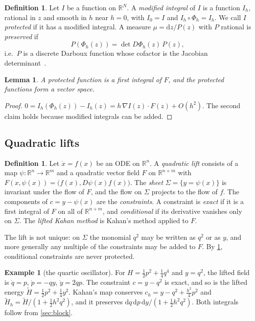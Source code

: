 \documentclass[11pt,a4paper]{article}
\newtheorem{lemma}[theorem]{Lemma}
\theoremstyle{definition}
\newtheorem{definition}[theorem]{Definition}
\newtheorem{example}[theorem]{Example}
\theoremstyle{remark}
\newcommand{\R}{\mathbb{R}}
\newcommand{\dd}{\mathrm{d}}
\begin{document}
\begin{definition}
Let $I$ be a function on $\R^N$. A \emph{modified integral} of $I$ is a function $I_h$, rational in $z$ and
smooth in $h$ near $h=0$, with $I_0=I$ and $I_h\circ\Phi_h=I_h$. We call $I$ \emph{protected} if it has a
modified integral. A measure $\mu=\dd z/P(z)$ with $P$ rational is \emph{preserved} if
\begin{equation}\label{eq:measure}
P(\Phi_h(z))=\det D\Phi_h(z)\,P(z),
\end{equation}
i.e.\ $P$ is a discrete Darboux function whose cofactor is the Jacobian determinant~\cite{CEMOQTvdK19}.
\end{definition}

\begin{lemma}\label{lem:protected}
A protected function is a first integral of $F$, and the protected functions form a vector space.
\end{lemma}

\begin{proof}
$0=I_h(\Phi_h(z))-I_h(z)=h\,\nabla I(z)\cdot F(z)+O(h^2)$. The second claim holds because modified integrals
can be added.
\end{proof}

\subsection{Quadratic lifts}

\begin{definition}\label{def:lift}
Let $\dot x=f(x)$ be an ODE on $\R^n$. A \emph{quadratic lift} consists of a map $\psi\colon\R^n\to\R^m$ and a
quadratic vector field $F$ on $\R^{n+m}$ with $F(x,\psi(x))=\big(f(x),D\psi(x)f(x)\big)$. The \emph{sheet}
$\Sigma=\{y=\psi(x)\}$ is invariant under the flow of $F$, and the flow on $\Sigma$ projects to the flow of $f$.
The components of $c=y-\psi(x)$ are the \emph{constraints}. A constraint is \emph{exact} if it is a first
integral of $F$ on all of $\R^{n+m}$, and \emph{conditional} if its derivative vanishes only on $\Sigma$. The
\emph{lifted Kahan method} is Kahan's method applied to $F$.
\end{definition}

The lift is not unique: on $\Sigma$ the monomial $q^2$ may be written as $q^2$ or as $y$, and more generally
any multiple of the constraints may be added to $F$. By \cref{lem:protected}, conditional constraints are never protected.

\begin{example}[the quartic oscillator]\label{ex:quartic}
For $H=\frac12p^2+\frac14q^4$ and $y=q^2$, the lifted field is $\dot q=p$, $\dot p=-qy$, $\dot y=2qp$. The
constraint $c=y-q^2$ is exact, and so is the lifted energy $\tilde H=\frac12p^2+\frac14y^2$. Kahan's map
conserves $c_h=y-q^2+\tfrac{h^2}{4}p^2$ and $\tilde H_h=\tilde H/(1+\frac12h^2q^2)$, and it preserves
$\dd q\,\dd p\,\dd y/(1+\frac12h^2q^2)$. Both integrals follow from \cref{sec:block}.
\end{example}
\end{document}
